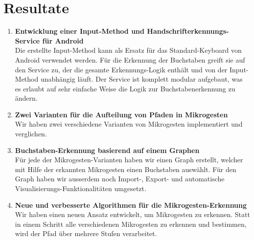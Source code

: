 \chapter{Resultate}

\begin{enumerate}
\item \textbf{Entwicklung einer Input-Method und Handschrifterkennungs-Service für Android} \\ 
Die erstellte Input-Method kann als Ersatz für das Standard-Keyboard von Android verwendet werden. Für die Erkennung der Buchstaben greift sie auf den Service zu, der die gesamte Erkennungs-Logik enthält und von der Input-Method unabhängig läuft.
Der Service ist komplett modular aufgebaut, was es erlaubt auf sehr einfache Weise die Logik zur Buchstabenerkennung zu ändern.

\item \textbf{Zwei Varianten für die Aufteilung von Pfaden in Mikrogesten} \\
Wir haben zwei verschiedene Varianten von Mikrogesten implementiert und verglichen. 

\item \textbf{Buchstaben-Erkennung basierend auf einem Graphen} \\
Für jede der Mikrogesten-Varianten haben wir einen Graph erstellt, welcher mit Hilfe der erkannten Mikrogesten einen Buchstaben auswählt. Für den Graph haben wir ausserdem noch Import-, Export- und automatische Visualisierungs-Funktionalitäten umgesetzt.

\item \textbf{Neue und verbesserte Algorithmen für die Mikrogesten-Erkennung} \\
Wir haben einen neuen Ansatz entwickelt, um Mikrogesten zu erkennen. Statt in einem Schritt alle verschiedenen Mikrogesten zu erkennen und bestimmen, wird der Pfad über mehrere Stufen verarbeitet. 

\end{enumerate}
